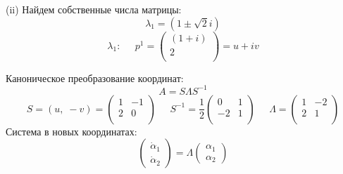 \documentclass[a4paper, 12pt]{article}
\begin{document}
(ii) Найдем собственные числа матрицы:
\[\lambda_1=  (1\pm \sqrt2 i)\]
\[\lambda_1:\;\;\;\;\; p^1=
\left(
\begin{array}{cc}
(1+ i)\\
2\\
\end{array}
\right)  = u+iv
\]


 Каноническое преобразование координат:
\[A = S\Lambda S^{-1}\]
\[
S = (u, \;-v) = \left(
\begin{array}{cc}
1 &- 1\\
2 & 0\\
\end{array}
\right)\;\;\;\;\;
S^{-1} = \frac 1 2\left(
\begin{array}{cc}
0 & 1\\
-2 & 1\\
\end{array}\right)\;\;\;\;\;
\Lambda =  \left(
\begin{array}{cc}
1 & - 2 \\
2  &  1  \\
\end{array}\right)
\]
Система в новых координатах:
\[\left(
\begin{array}{c}
\dot{\alpha}_1\\
\dot{\alpha}_2
\end{array}
\right)=\Lambda\left(
\begin{array}{c}
{\alpha}_1 \\
{\alpha}_2
\end{array}
\right)\]
\end{document}
